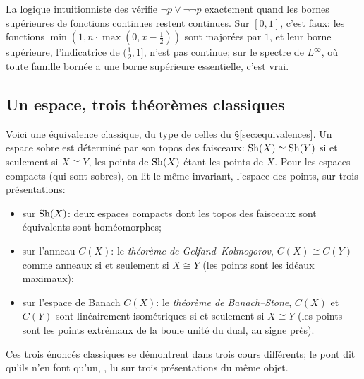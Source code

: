 \inwords{} La logique intuitionniste des  vérifie $\neg p\vee\neg\neg p$ exactement quand les bornes supérieures de fonctions continues restent continues. Sur $[0,1]$, c'est faux: les fonctions $\min(1, n\cdot\max(0, x-\tfrac12))$ sont majorées par $1$, et leur borne supérieure, l'indicatrice de $(\tfrac12,1]$, n'est pas continue; sur le spectre de $L^\infty$, où toute famille bornée a une borne supérieure essentielle, c'est vrai.

\subsection{Un espace, trois théorèmes classiques}

Voici une équivalence classique, du type de celles du \S\ref{sec:equivalences}. Un espace sobre est déterminé par son topos des faisceaux: $\mathrm{Sh}(X)\simeq\mathrm{Sh}(Y)$ si et seulement si $X\cong Y$, les points de $\mathrm{Sh}(X)$ étant les points de $X$. Pour les espaces compacts (qui sont sobres), on lit le même invariant, l'espace des points, sur trois présentations:
\begin{itemize}
\item sur $\mathrm{Sh}(X)$: deux espaces compacts dont les topos des faisceaux sont équivalents sont homéomorphes;
\item sur l'anneau $C(X)$: le \emph{théorème de Gelfand--Kolmogorov}, $C(X)\cong C(Y)$ comme anneaux si et seulement si $X\cong Y$ (les points sont les idéaux maximaux);
\item sur l'espace de Banach $C(X)$: le \emph{théorème de Banach--Stone}, $C(X)$ et $C(Y)$ sont linéairement isométriques si et seulement si $X\cong Y$ (les points sont les points extrémaux de la boule unité du dual, au signe près).
\end{itemize}
Ces trois énoncés classiques se démontrent dans trois cours différents; le pont dit qu'ils n'en font qu'un, , lu sur trois présentations du même objet.
